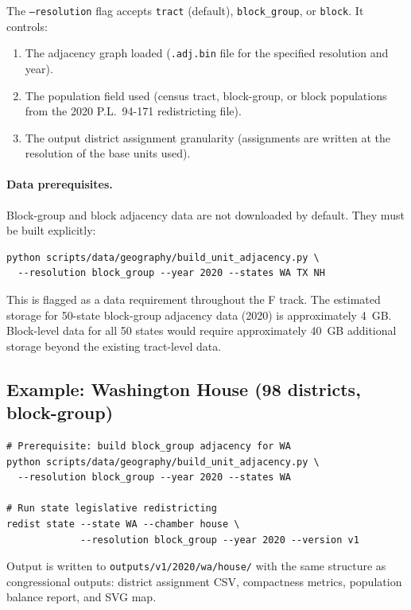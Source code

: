 The \texttt{--resolution} flag accepts \texttt{tract} (default),
\texttt{block\_group}, or \texttt{block}. It controls:
\begin{enumerate}
  \item The adjacency graph loaded (\texttt{.adj.bin} file for the specified
    resolution and year).
  \item The population field used (census tract, block-group, or block populations
    from the 2020 P.L.~94-171 redistricting file).
  \item The output district assignment granularity (assignments are written at
    the resolution of the base units used).
\end{enumerate}

\paragraph{Data prerequisites.}
Block-group and block adjacency data are not downloaded by default.
They must be built explicitly:
\begin{verbatim}
python scripts/data/geography/build_unit_adjacency.py \
  --resolution block_group --year 2020 --states WA TX NH
\end{verbatim}

This is flagged as a data requirement throughout the F track. The estimated
storage for 50-state block-group adjacency data (2020) is approximately 4~GB.
Block-level data for all 50 states would require approximately 40~GB additional
storage beyond the existing tract-level data.

\subsection{Example: Washington House (98 districts, block-group)}
\label{sec:cli:example}

\begin{verbatim}
# Prerequisite: build block_group adjacency for WA
python scripts/data/geography/build_unit_adjacency.py \
  --resolution block_group --year 2020 --states WA

# Run state legislative redistricting
redist state --state WA --chamber house \
             --resolution block_group --year 2020 --version v1
\end{verbatim}

Output is written to \texttt{outputs/v1/2020/wa/house/} with the same
structure as congressional outputs: district assignment CSV, compactness metrics,
population balance report, and SVG map.


